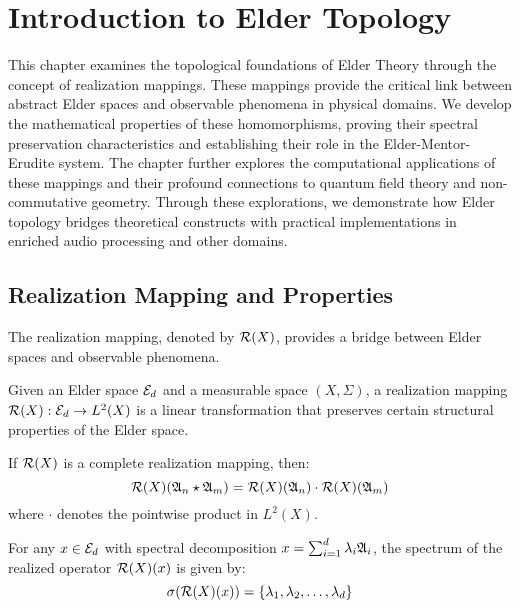 \chapter{Introduction to Elder Topology}

\begin{chapterabstract}
This chapter examines the topological foundations of Elder Theory through the concept of realization mappings. These mappings provide the critical link between abstract Elder spaces and observable phenomena in physical domains. We develop the mathematical properties of these homomorphisms, proving their spectral preservation characteristics and establishing their role in the Elder-Mentor-Erudite system. The chapter further explores the computational applications of these mappings and their profound connections to quantum field theory and non-commutative geometry. Through these explorations, we demonstrate how Elder topology bridges theoretical constructs with practical implementations in enriched audio processing and other domains.
\end{chapterabstract}

\section{Realization Mapping and Properties}

The realization mapping, denoted by $\mathcal{R}(X)$, provides a bridge between Elder spaces and observable phenomena.

\begin{definition}
Given an Elder space $\mathcal{E}_{d}$ and a measurable space $(X, \Sigma)$, a realization mapping $\mathcal{R}(X): \mathcal{E}_{d} \rightarrow L^2(X)$ is a linear transformation that preserves certain structural properties of the Elder space.
\end{definition}

\begin{theorem}
If $\mathcal{R}(X)$ is a complete realization mapping, then:
\begin{equation}
\mathcal{R}(X)(\mathfrak{A}_{n} \star \mathfrak{A}_{m}) = \mathcal{R}(X)(\mathfrak{A}_{n}) \cdot \mathcal{R}(X)(\mathfrak{A}_{m})
\end{equation}
where $\cdot$ denotes the pointwise product in $L^2(X)$.
\end{theorem}

\begin{lemma}
For any $x \in \mathcal{E}_{d}$ with spectral decomposition $x = \sum_{i=1}^{d} \lambda_i \mathfrak{A}_{i}$, the spectrum of the realized operator $\mathcal{R}(X)(x)$ is given by:
\begin{equation}
\sigma(\mathcal{R}(X)(x)) = \{\lambda_1, \lambda_2, \ldots, \lambda_d\}
\end{equation}
\end{lemma}

